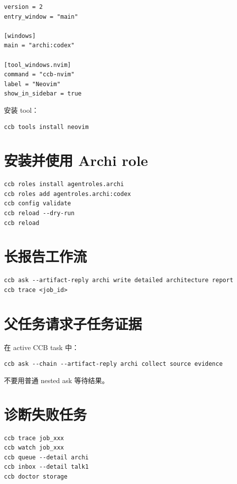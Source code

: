 \begin{lstlisting}
version = 2
entry_window = "main"

[windows]
main = "archi:codex"

[tool_windows.nvim]
command = "ccb-nvim"
label = "Neovim"
show_in_sidebar = true
\end{lstlisting}

安装 tool：

\begin{lstlisting}
ccb tools install neovim
\end{lstlisting}

\section{安装并使用 Archi role}

\begin{lstlisting}
ccb roles install agentroles.archi
ccb roles add agentroles.archi:codex
ccb config validate
ccb reload --dry-run
ccb reload
\end{lstlisting}

\section{长报告工作流}

\begin{lstlisting}
ccb ask --artifact-reply archi write detailed architecture report
ccb trace <job_id>
\end{lstlisting}

\section{父任务请求子任务证据}

在 active CCB task 中：

\begin{lstlisting}
ccb ask --chain --artifact-reply archi collect source evidence
\end{lstlisting}

不要用普通 nested ask 等待结果。

\section{诊断失败任务}

\begin{lstlisting}
ccb trace job_xxx
ccb watch job_xxx
ccb queue --detail archi
ccb inbox --detail talk1
ccb doctor storage
\end{lstlisting}

